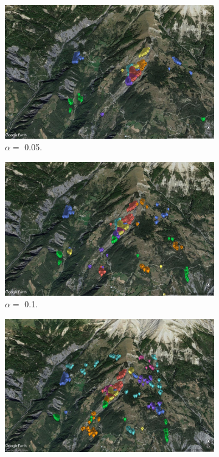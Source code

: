\documentclass[11pt, openany]{report}
\begin{document}
\begin{figure}[!h]
  \begin{subfigure}[b]{0.5\textwidth}
    \includegraphics[width=\textwidth]{test_reg_kurtosis_0.jpg}
    \caption{$\alpha = $ 0.05.}
    \label{fig:f1}
  \end{subfigure}
  \hfill
  \begin{subfigure}[b]{0.5\textwidth}
    \includegraphics[width=\textwidth]{test_reg_kurtosis_1.jpg}
    \caption{$\alpha = $ 0.1.}
    \label{fig:f2}
  \end{subfigure}
   \hfill
  \begin{subfigure}[b]{0.5\textwidth}
    \includegraphics[width=\textwidth]{test_reg_kurtosis_2.jpg}

\end{subfigure}
\end{figure}
\end{document}
